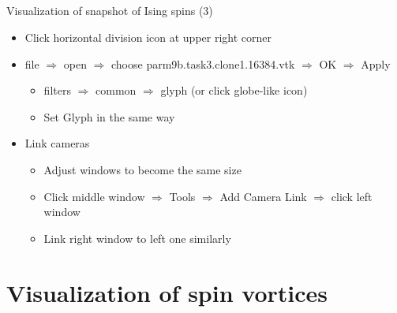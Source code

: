 \subsection*{\redb\whiteb\greenm}
\begin{frame}[t,fragile]{Visualization of snapshot of Ising spins (3)}
  \begin{itemize}
  \item Click horizontal division icon at upper right corner
  \item file $\Rightarrow$ open $\Rightarrow$ choose parm9b.task3.clone1.16384.vtk $\Rightarrow$ OK $\Rightarrow$ Apply
    \begin{itemize}
      \item filters $\Rightarrow$ common $\Rightarrow$ glyph (or click globe-like icon)
      \item Set Glyph in the same way
    \end{itemize}
  \item Link cameras
    \begin{itemize}
    \item Adjust windows to become the same size
    \item Click middle window $\Rightarrow$ Tools $\Rightarrow$ Add Camera Link $\Rightarrow$ click left window
    \item Link right window to left one similarly
    \end{itemize}
  \end{itemize}
\end{frame}

\section{Visualization of spin vortices}

